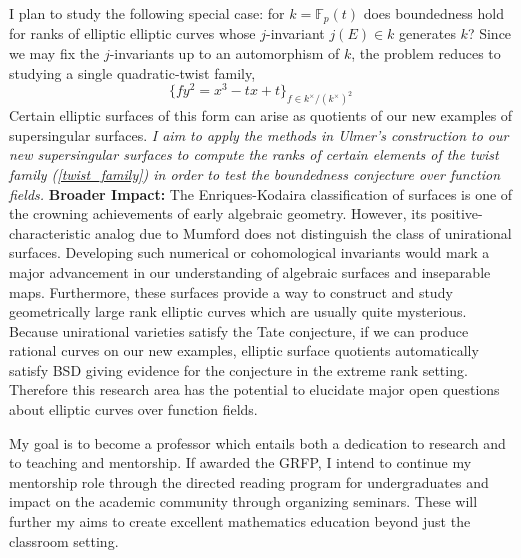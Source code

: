 \documentclass[11pt]{article}
\newcommand{\FF}{\mathbb{F}}
\begin{document}
I plan to study the following special case: for $k = \FF_p(t)$ does boundedness hold for ranks of elliptic elliptic curves whose $j$-invariant $j(E) \in k$ generates $k$? Since we may fix the $j$-invariants up to an automorphism of $k$, the problem reduces to studying a single quadratic-twist family, 
\begin{equation} \label{twist_family}
\{ f y^2 = x^3 - t x + t \}_{f \in k^\times / (k^\times)^2} 
\end{equation} 
Certain elliptic surfaces of this form can arise as quotients of our new examples of supersingular surfaces. \emph{I aim to apply the methods in Ulmer's construction to our new supersingular surfaces to compute the ranks of certain elements of the twist family (\ref{twist_family}) in order to test the boundedness conjecture over function fields.}
\newline
\noindent
\textbf{Broader Impact:}
The Enriques-Kodaira classification of surfaces is one of the crowning achievements of early algebraic geometry. However, its positive-characteristic analog due to Mumford  does not distinguish the class of unirational surfaces. Developing such numerical or cohomological invariants would mark a major advancement in our understanding of algebraic surfaces and inseparable maps. Furthermore, these surfaces provide a way to construct and study geometrically large rank elliptic curves which are usually quite mysterious. Because unirational varieties satisfy the Tate conjecture, if we can produce rational curves on our new examples, elliptic surface quotients automatically satisfy BSD giving evidence for the conjecture in the extreme rank setting. Therefore this research area has the potential to elucidate major open questions about elliptic curves over function fields.  
\par
My goal is to become a professor which entails both a dedication to research and to teaching and mentorship. If awarded the GRFP, I intend to continue my mentorship role through the directed reading program for undergraduates and impact on the academic community through organizing seminars. These will further my aims to create excellent mathematics education beyond just the classroom setting.
\vspace{-2.5em}
\begingroup
\let\enotesize\normalsize
\renewcommand\notesname{\hrulefill \vspace{-0.9em}}
\theendnotes
\endgroup
\end{document}
